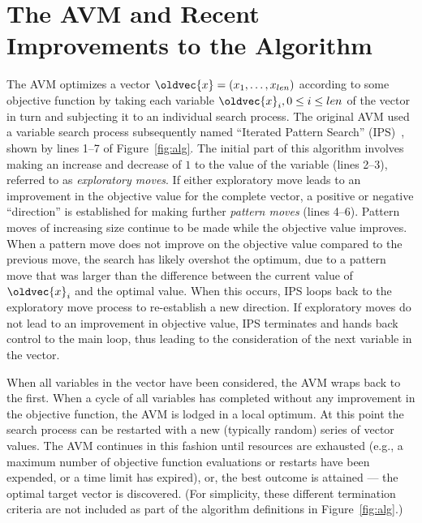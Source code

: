 \documentclass{llncs}
\let\vec\oldvec %
\newcommand{\inlineheading}[1]{\vspace{1mm} \noindent {\bf #1.}}
\begin{document}
\section{The AVM and Recent Improvements to the Algorithm}
\vspace{-1em}
\inlineheading{The original AVM} The AVM optimizes a vector $\vec{x} = (x_1, \dots, x_{len})$ according to some objective function by taking each variable $\vec{x}_i, 0 \leq i \leq len$ of the vector in turn and subjecting it to an individual search process. The original AVM used a variable search process subsequently named
``Iterated Pattern Search'' (IPS)~\cite{Kempka2013,Kempka2015}, shown by lines 1--7 of Figure~\ref{fig:alg}. The initial part of
this algorithm involves making an increase and decrease of $1$ to the value of the variable (lines 2--3), referred to as
{\it exploratory moves}. If either exploratory move leads to an improvement in the objective value for the complete
vector, a positive or negative ``direction'' is established for making further {\it pattern moves} (lines 4--6). Pattern
moves of increasing size continue to be made while the objective value improves. When a pattern move does not improve on
the objective value compared to the previous move, the search has likely overshot the optimum, due to a pattern move
that was larger than the difference between the current value of $\vec{x}_i$ and the optimal value. When this occurs,
IPS loops back to the exploratory move process to re-establish a new direction. If exploratory moves do not lead to an
improvement in objective value, IPS terminates and hands back control to the main loop, thus leading to the consideration of the next variable in the vector.

When all variables in the vector have been considered, the AVM wraps back to the first. When a cycle of all variables has completed without any improvement in the objective function, the AVM is lodged in a local optimum. At this point the search process can be restarted with a new (typically random) series of vector values. The AVM continues in this fashion until resources are exhausted (e.g., a maximum number of objective function evaluations or restarts have been expended, or a time limit has expired), or, the best outcome is attained --- the optimal target vector is discovered. (For simplicity, these different termination criteria are not included as part of the algorithm definitions in Figure~\ref{fig:alg}.)
\end{document}
